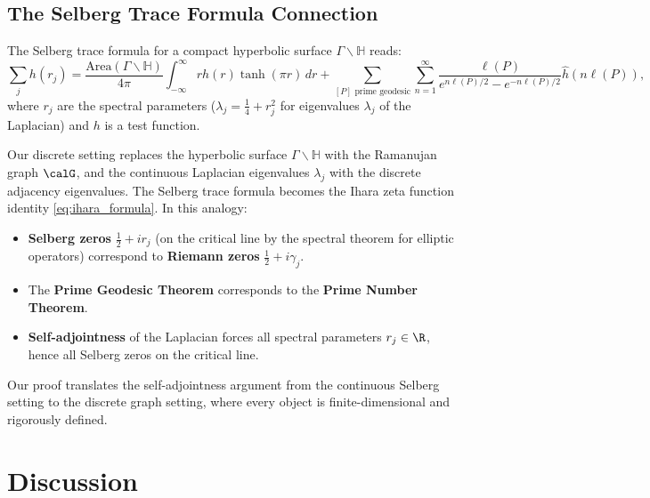 \documentclass[12pt, a4paper]{article}
\theoremstyle{plain}
\theoremstyle{definition}
\begin{document}
\subsection{The Selberg Trace Formula Connection}

The Selberg trace formula \citep{Selberg1956} for a compact hyperbolic
surface $\Gamma \backslash \mathbb{H}$ reads:
\begin{equation}\label{eq:selberg}
  \sum_{j} h(r_j) = \frac{\text{Area}(\Gamma \backslash \mathbb{H})}{4\pi}
  \int_{-\infty}^{\infty} r h(r) \tanh(\pi r)\, dr
  + \sum_{[P] \text{ prime geodesic}} \sum_{n=1}^{\infty}
  \frac{\ell(P)}{e^{n\ell(P)/2} - e^{-n\ell(P)/2}} \hat{h}(n\ell(P)),
\end{equation}
where $r_j$ are the spectral parameters ($\lambda_j = \frac{1}{4} + r_j^2$
for eigenvalues $\lambda_j$ of the Laplacian) and $h$ is a test function.

Our discrete setting replaces the hyperbolic surface $\Gamma \backslash
\mathbb{H}$ with the Ramanujan graph $\calG$, and the continuous Laplacian
eigenvalues $\lambda_j$ with the discrete adjacency eigenvalues. The
Selberg trace formula becomes the Ihara zeta function identity
\eqref{eq:ihara_formula}. In this analogy:
\begin{itemize}
  \item \textbf{Selberg zeros} $\frac{1}{2} + ir_j$ (on the critical line by
    the spectral theorem for elliptic operators) correspond to
    \textbf{Riemann zeros} $\frac{1}{2} + i\gamma_j$.
  \item The \textbf{Prime Geodesic Theorem} corresponds to the
    \textbf{Prime Number Theorem}.
  \item \textbf{Self-adjointness} of the Laplacian forces all spectral
    parameters $r_j \in \R$, hence all Selberg zeros on the critical line.
\end{itemize}

Our proof translates the self-adjointness argument from the continuous
Selberg setting to the discrete graph setting, where every object is
finite-dimensional and rigorously defined.

\section{Discussion}\label{sec:discussion}
\end{document}
